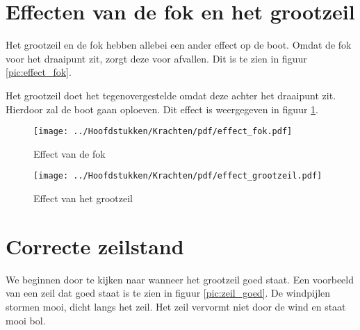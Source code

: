 \section{Effecten van de fok en het grootzeil}
Het grootzeil en de fok hebben allebei een ander effect op de boot. Omdat de fok voor het draaipunt zit, zorgt deze voor afvallen. Dit is te zien in figuur \ref{pic:effect_fok}.

Het grootzeil doet het tegenovergestelde omdat deze achter het draaipunt zit. Hierdoor zal de boot gaan oploeven. Dit effect is weergegeven in figuur \ref{pic:effect_grootzeil}.
\begin{figure}[ht]
  \centering
  \begin{minipage}[b]{0.49\textwidth}
  \centering
    \texttt{[image: ../Hoofdstukken/Krachten/pdf/effect\_fok.pdf]}
    \caption{Effect van de fok}
    \label{pic:effect_fok}
  \end{minipage}
  \hfill
  \begin{minipage}[b]{0.49\textwidth}
    \centering
    \texttt{[image: ../Hoofdstukken/Krachten/pdf/effect\_grootzeil.pdf]}
    \caption{Effect van het grootzeil}
    \label{pic:effect_grootzeil}
    \end{minipage}
\end{figure}
\section{Correcte zeilstand}
We beginnen door te kijken naar wanneer het grootzeil goed staat. Een voorbeeld van een zeil dat goed staat is te zien in figuur \ref{pic:zeil_goed}. De windpijlen stormen mooi, dicht langs het zeil. Het zeil vervormt niet door de wind en staat mooi bol.

